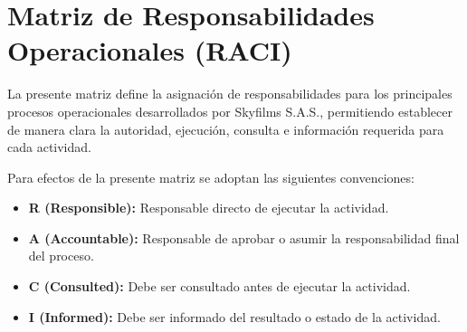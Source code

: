 \section{Matriz de Responsabilidades Operacionales (RACI)}

La presente matriz define la asignación de responsabilidades para los principales procesos operacionales desarrollados por Skyfilms S.A.S., permitiendo establecer de manera clara la autoridad, ejecución, consulta e información requerida para cada actividad.

Para efectos de la presente matriz se adoptan las siguientes convenciones:

\begin{itemize}
\item \textbf{R (Responsible):} Responsable directo de ejecutar la actividad.
\item \textbf{A (Accountable):} Responsable de aprobar o asumir la responsabilidad final del proceso.
\item \textbf{C (Consulted):} Debe ser consultado antes de ejecutar la actividad.
\item \textbf{I (Informed):} Debe ser informado del resultado o estado de la actividad.
\end{itemize}

\renewcommand{\arraystretch}{1.4}

\begingroup\scriptsize

